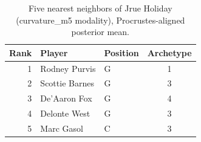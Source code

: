 \begin{table}[htbp]
  \centering\small
  \begin{tabular}{rllc}
    \toprule
    Rank & Player & Position & Archetype \\
    \midrule
    1 & Rodney Purvis & G & 1 \\
    2 & Scottie Barnes & G & 3 \\
    3 & De'Aaron Fox & G & 4 \\
    4 & Delonte West & G & 3 \\
    5 & Marc Gasol & C & 3 \\
    \bottomrule
  \end{tabular}
  \caption{Five nearest neighbors of Jrue Holiday (curvature_m5 modality), Procrustes-aligned posterior mean.}
  \label{tab:Jrue_Holiday_neighbors_curvature_m5}
\end{table}

